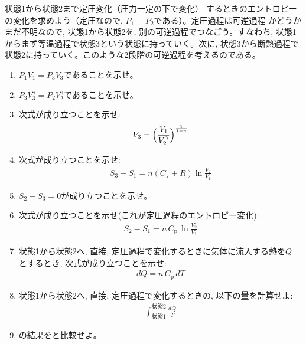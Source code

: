 \begin{exq}\label{exq:entropy_constP} 状態1から状態2まで定圧変化（圧力一定の下で変化）
するときのエントロピーの変化を求めよう（定圧なので, $P_1=P_2$である）。定圧過程は可逆過程
かどうかまだ不明なので, 状態1から状態2を, 別の可逆過程でつなごう。すなわち, 
状態1からまず等温過程で状態3という状態に持っていく。次に, 
状態3から断熱過程で状態2に持っていく。このような2段階の可逆過程を考えるのである。
\begin{enumerate}
\item $P_1V_1=P_3V_3$であることを示せ。
\item $P_3V_3^{\gamma}=P_2V_2^{\gamma}$であることを示せ。
\item 次式が成り立つことを示せ:
\begin{eqnarray}
V_3=\Bigl(\frac{V_1}{V_2^{\gamma}}\Bigr)^{\frac{1}{1-\gamma}}
\end{eqnarray}
\item 次式が成り立つことを示せ:
\begin{eqnarray}
S_3-S_1=n(C_{\text{v}}+R)\ln \frac{V_2}{V_1}
\end{eqnarray}
\item $S_2-S_3=0$が成り立つことを示せ。
\item 次式が成り立つことを示せ(これが定圧過程のエントロピー変化):
\begin{eqnarray}
S_2-S_1=n\,C_{\text{p}}\,\ln \frac{V_2}{V_1}\label{eq:entropy_constP6}
\end{eqnarray}
\item 状態1から状態2へ, 直接, 定圧過程で変化するときに気体に流入する熱を$Q$
とするとき, 次式が成り立つことを示せ:
\begin{eqnarray}
dQ=n\,C_{\text{p}}\,dT
\end{eqnarray}
\item 状態1から状態2へ, 直接, 定圧過程で変化するときの, 以下の量を計算せよ:
\begin{eqnarray}
\int_{\text{状態1}}^{\text{状態2}} \frac{dQ}{T}\label{eq:entropy_constP8}
\end{eqnarray}
\item {}の結果をと比較せよ。
\end{enumerate}
\end{exq}

